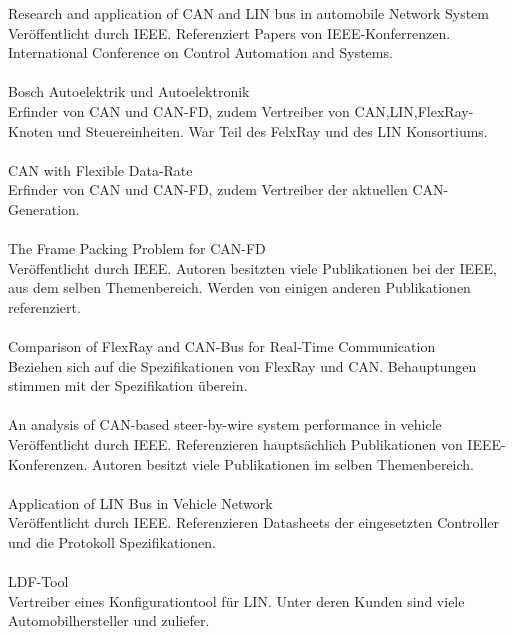 Research and application of CAN and LIN bus in automobile Network System \cite{LA_CAN2}\\
Veröffentlicht durch IEEE. Referenziert Papers von IEEE-Konferrenzen.
International Conference on Control Automation and Systems.\\\\

Bosch Autoelektrik und Autoelektronik \cite{reif2011bosch}\\
Erfinder von CAN und CAN-FD, zudem Vertreiber von CAN,LIN,FlexRay-Knoten
und Steuereinheiten. War Teil des FelxRay und des LIN Konsortiums.\\\\

CAN with Flexible Data-Rate \cite{LA_CAN_FD1}\\
Erfinder von CAN und CAN-FD, zudem Vertreiber der aktuellen CAN-Generation.\\\\

The Frame Packing Problem for CAN-FD \cite{LA_CAN_FD2}\\
Veröffentlicht durch IEEE. Autoren besitzten viele Publikationen
bei der IEEE, aus dem selben Themenbereich. Werden von einigen anderen
Publikationen referenziert.\\\\

Comparison of FlexRay and CAN-Bus for Real-Time Communication \cite{LA_FR1}\\
Beziehen sich auf die Spezifikationen von FlexRay und CAN. 
Behauptungen stimmen mit der Spezifikation überein.\\\\

An analysis of CAN-based steer-by-wire system performance in vehicle \cite{LA_CAN3}\\
Veröffentlicht durch IEEE. Referenzieren hauptsächlich Publikationen von IEEE-Konferenzen.
Autoren besitzt viele Publikationen im selben Themenbereich.\\\\

Application of LIN Bus in Vehicle Network \cite{LA_LIN1}\\
Veröffentlicht durch IEEE. 
Referenzieren Datasheets der eingesetzten Controller und die Protokoll Spezifikationen.\\\\

LDF-Tool \cite{LA_LDF-Tool}\\
Vertreiber eines Konfigurationtool für LIN. Unter deren Kunden sind viele
Automobilhersteller und zuliefer.\\\\

